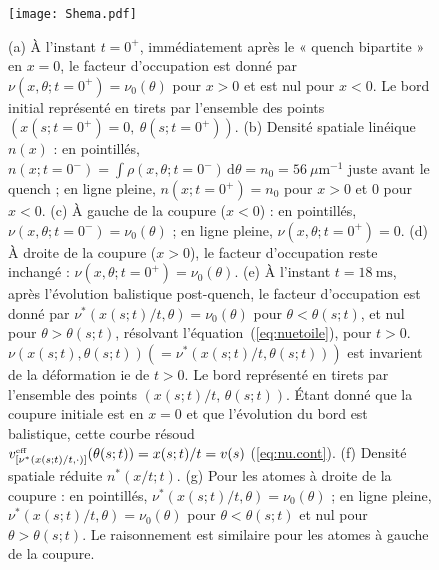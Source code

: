 \begin{figure}[H]
	\centering
	\texttt{[image: Shema.pdf]}
	\label{fig:BiPart.coupure1}
	\caption{
(a) À l'instant $t = 0^+$, immédiatement après le « quench bipartite » en $x = 0$, le facteur d'occupation est donné par $\nu(x, \theta ; t = 0^+) = \nu_0(\theta)$ pour $x > 0$ et est nul pour $x < 0$. Le bord initial représenté en tirets par l'ensemble des points $(x(s; t = 0^+) = 0,\ \theta(s; t = 0^+))$.
(b) Densité spatiale linéique $n(x)$ : en pointillés, $n(x; t = 0^-) = \int \rho(x, \theta; t = 0^-) \, \mathrm{d}\theta = n_0 = 56~\mu\mathrm{m}^{-1}$ juste avant le quench ; en ligne pleine, $n(x; t = 0^+) = n_0$ pour $x > 0$ et $0$ pour $x < 0$.
(c) À gauche de la coupure ($x < 0$) : en pointillés, $\nu(x, \theta ; t = 0^-) = \nu_0(\theta)$ ; en ligne pleine, $\nu(x, \theta ; t = 0^+) = 0$.
(d) À droite de la coupure ($x > 0$), le facteur d'occupation reste inchangé : $\nu(x, \theta ; t = 0^+) = \nu_0(\theta)$.
(e) À l'instant $t = 18~\mathrm{ms}$, après l'évolution balistique post-quench, le facteur d'occupation est donné par $\nu^\ast(x(s;t)/t, \theta) = \nu_0(\theta)$ pour $\theta < \theta(s;t)$, et nul pour $\theta > \theta(s;t)$, résolvant l'équation~(\ref{eq:nuetoile}), pour $t>0$. $\nu(x(s;t), \theta(s;t))(=\nu^\ast(x(s;t)/t, \theta(s;t)))$ est invarient de la déformation ie de $t>0$.  Le bord représenté en tirets par l'ensemble des points $(x(s; t)/t,\, \theta(s; t))$. Étant donné que la coupure initiale est en $x = 0$ et que l’évolution du bord est balistique, cette courbe résoud $v^{\mbox{\tiny eff}}_{[\nu^\ast(x(s; t)/t, \cdot) ]}(\theta(s; t)) = x(s; t)/t = v(s)$ (\ref{eq:nu.cont}).
(f) Densité spatiale réduite $n^\ast(x/t; t)$.
(g) Pour les atomes à droite de la coupure : en pointillés, $\nu^\ast(x(s;t)/t, \theta) = \nu_0(\theta)$ ; en ligne pleine, $\nu^\ast(x(s;t)/t, \theta) = \nu_0(\theta)$ pour $\theta < \theta(s;t)$ et nul pour $\theta > \theta(s;t)$. Le raisonnement est similaire pour les atomes à gauche de la coupure.
}
	
\end{figure}


